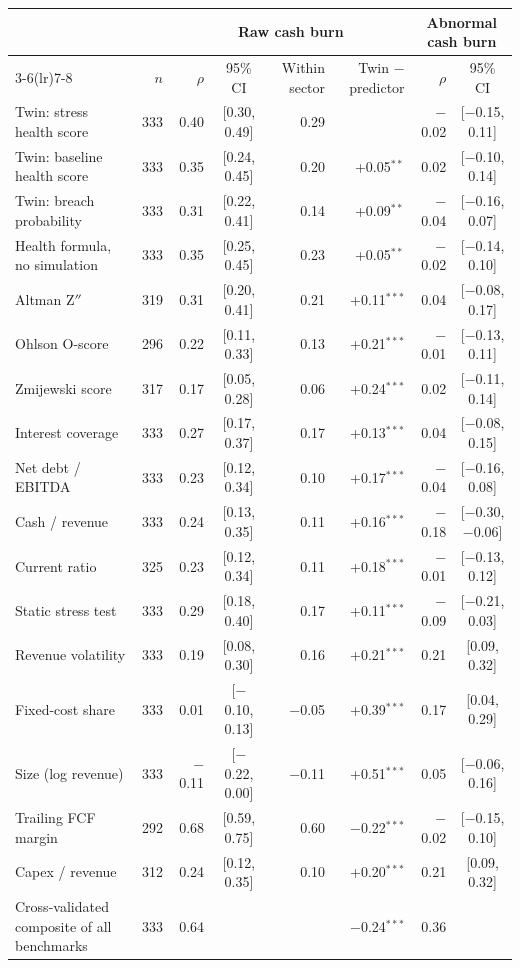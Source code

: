 \begin{tabular}{lrrcrrrc}
\toprule
 & & \multicolumn{4}{c}{Raw cash burn} & \multicolumn{2}{c}{Abnormal cash burn} \\
\cmidrule(lr){3-6}\cmidrule(lr){7-8}
 & $n$ & $\rho$ & 95\% CI & Within sector & Twin $-$ predictor & $\rho$ & 95\% CI \\
\midrule
Twin: stress health score & 333 & 0.40 & [0.30, 0.49] & 0.29 &  & $-$0.02 & [$-$0.15, 0.11] \\
Twin: baseline health score & 333 & 0.35 & [0.24, 0.45] & 0.20 & +0.05$^{**}$ & 0.02 & [$-$0.10, 0.14] \\
Twin: breach probability & 333 & 0.31 & [0.22, 0.41] & 0.14 & +0.09$^{**}$ & $-$0.04 & [$-$0.16, 0.07] \\
Health formula, no simulation & 333 & 0.35 & [0.25, 0.45] & 0.23 & +0.05$^{**}$ & $-$0.02 & [$-$0.14, 0.10] \\
\addlinespace
Altman Z$''$ & 319 & 0.31 & [0.20, 0.41] & 0.21 & +0.11$^{***}$ & 0.04 & [$-$0.08, 0.17] \\
Ohlson O-score & 296 & 0.22 & [0.11, 0.33] & 0.13 & +0.21$^{***}$ & $-$0.01 & [$-$0.13, 0.11] \\
Zmijewski score & 317 & 0.17 & [0.05, 0.28] & 0.06 & +0.24$^{***}$ & 0.02 & [$-$0.11, 0.14] \\
Interest coverage & 333 & 0.27 & [0.17, 0.37] & 0.17 & +0.13$^{***}$ & 0.04 & [$-$0.08, 0.15] \\
Net debt / EBITDA & 333 & 0.23 & [0.12, 0.34] & 0.10 & +0.17$^{***}$ & $-$0.04 & [$-$0.16, 0.08] \\
Cash / revenue & 333 & 0.24 & [0.13, 0.35] & 0.11 & +0.16$^{***}$ & $-$0.18 & [$-$0.30, $-$0.06] \\
Current ratio & 325 & 0.23 & [0.12, 0.34] & 0.11 & +0.18$^{***}$ & $-$0.01 & [$-$0.13, 0.12] \\
Static stress test & 333 & 0.29 & [0.18, 0.40] & 0.17 & +0.11$^{***}$ & $-$0.09 & [$-$0.21, 0.03] \\
Revenue volatility & 333 & 0.19 & [0.08, 0.30] & 0.16 & +0.21$^{***}$ & 0.21 & [0.09, 0.32] \\
Fixed-cost share & 333 & 0.01 & [$-$0.10, 0.13] & $-$0.05 & +0.39$^{***}$ & 0.17 & [0.04, 0.29] \\
Size (log revenue) & 333 & $-$0.11 & [$-$0.22, 0.00] & $-$0.11 & +0.51$^{***}$ & 0.05 & [$-$0.06, 0.16] \\
\addlinespace
Trailing FCF margin & 292 & 0.68 & [0.59, 0.75] & 0.60 & $-$0.22$^{***}$ & $-$0.02 & [$-$0.15, 0.10] \\
Capex / revenue & 312 & 0.24 & [0.12, 0.35] & 0.10 & +0.20$^{***}$ & 0.21 & [0.09, 0.32] \\
\addlinespace
Cross-validated composite of all benchmarks & 333 & 0.64 & & & $-$0.24$^{***}$ & 0.36 & \\
\bottomrule
\end{tabular}
